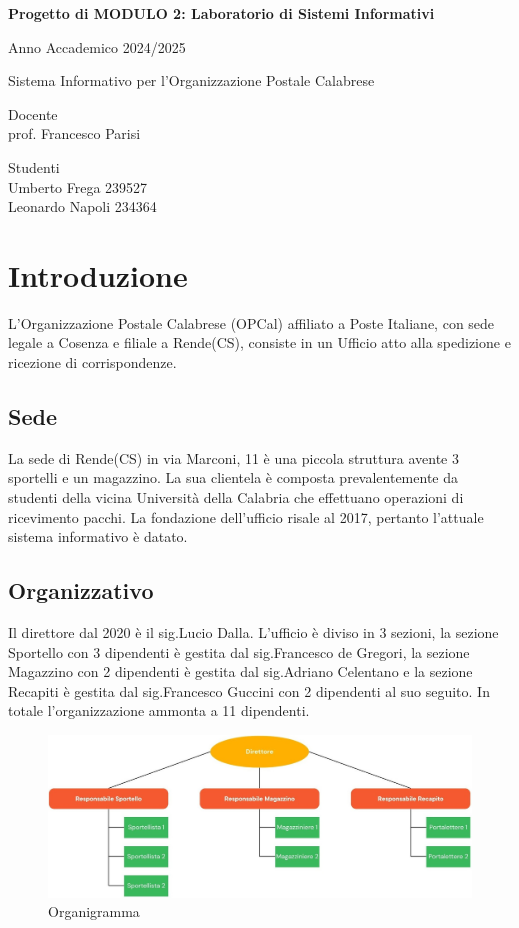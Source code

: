 \documentclass[a4paper,12pt]{article}
\author{Umberto Frega, Leonardo Napoli}
\begin{document}
\pagestyle{fancy}

\begin{titlepage}
	\centering
	{\Large \bfseries Progetto di MODULO 2: Laboratorio di Sistemi Informativi\par}
	{\Large Anno Accademico 2024/2025 \par}
	\vspace{1cm} %
	\vfill
	{\huge Sistema Informativo per l'Organizzazione Postale Calabrese\par}
	\vfill
	\noindent
	\begin{minipage}[t]{0.5\textwidth}
		\raggedright
		Docente \\  prof. Francesco Parisi
	\end{minipage}%
	\hfill
	\begin{minipage}[t]{0.4\textwidth}
		\raggedleft
		Studenti \\ Umberto Frega 239527 \\ Leonardo Napoli 234364
	\end{minipage}

\end{titlepage}
	\tableofcontents
	\newpage
\section{Introduzione}
L'Organizzazione Postale Calabrese (OPCal) affiliato a Poste Italiane, con sede legale a Cosenza e filiale a Rende(CS), 
consiste in un Ufficio atto alla spedizione e ricezione di corrispondenze.
\subsection{Sede}
La sede di Rende(CS) in via Marconi, 11 è una piccola struttura avente 3 sportelli e un magazzino. La sua clientela è composta 
prevalentemente da studenti della vicina Università della Calabria che effettuano operazioni di ricevimento pacchi.
La fondazione dell'ufficio risale al 2017, pertanto l'attuale sistema informativo è datato.
\subsection{Organizzativo}
Il direttore dal 2020 è il sig.Lucio Dalla. L'ufficio è diviso in 3 sezioni, la sezione Sportello con 3 dipendenti è gestita 
dal sig.Francesco de Gregori, la sezione Magazzino con 2 dipendenti è gestita dal sig.Adriano Celentano e la sezione Recapiti 
è gestita dal sig.Francesco Guccini con 2 dipendenti al suo seguito. In totale l'organizzazione ammonta a 11 dipendenti.
\begin{figure}[h]
	\centering
	\includegraphics[width=0.8\linewidth]{assets/organigramma.jpg}
	\caption{Organigramma}
\end{figure}
\end{document}
